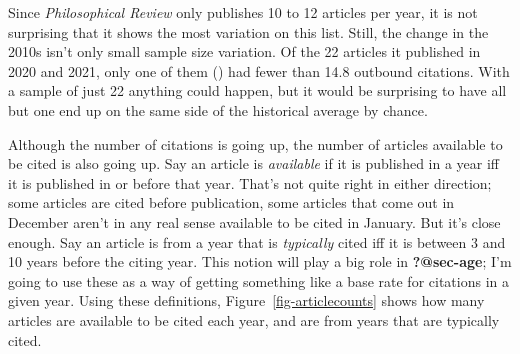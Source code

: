 \documentclass[
  12pt,
  letterpaper,
  DIV=11,
  numbers=noendperiod]{scrartcl}
\begin{document}
Since \emph{Philosophical Review} only publishes 10 to 12 articles per
year, it is not surprising that it shows the most variation on this
list. Still, the change in the 2010s isn't only small sample size
variation. Of the 22 articles it published in 2020 and 2021, only one of
them () had fewer than
14.8 outbound citations. With a sample of just 22 anything could happen,
but it would be surprising to have all but one end up on the same side
of the historical average by chance.

Although the number of citations is going up, the number of articles
available to be cited is also going up. Say an article is
\emph{available} if it is published in a year iff it is published in or
before that year. That's not quite right in either direction; some
articles are cited before publication, some articles that come out in
December aren't in any real sense available to be cited in January. But
it's close enough. Say an article is from a year that is
\emph{typically} cited iff it is between 3 and 10 years before the
citing year. This notion will play a big role in \textbf{?@sec-age}; I'm
going to use these as a way of getting something like a base rate for
citations in a given year. Using these definitions,
Figure~\ref{fig-articlecounts} shows how many articles are available to
be cited each year, and are from years that are typically cited.
\end{document}
